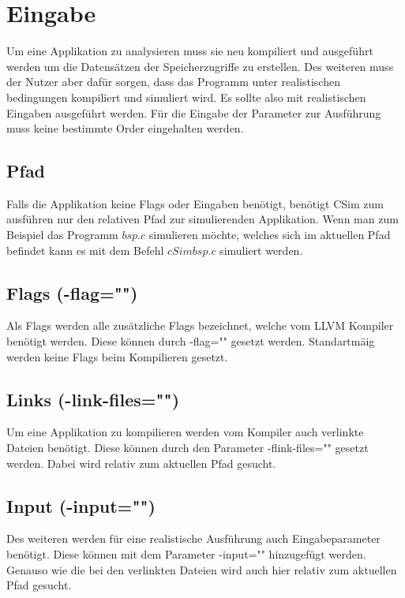 \documentclass{scrreprt}
\begin{document}
\section{Eingabe}

Um eine Applikation zu analysieren muss sie neu kompiliert und ausgeführt werden um die Datensätzen der Speicherzugriffe zu erstellen. Des weiteren muss der Nutzer aber dafür sorgen, dass das Programm unter realistischen bedingungen kompiliert und simuliert wird. Es sollte also mit realistischen Eingaben ausgeführt werden.\newline
Für die Eingabe der Parameter zur Ausführung muss keine bestimmte Order eingehalten werden.

\subsection{Pfad}

Falls die Applikation keine Flags oder Eingaben benötigt, benötigt CSim zum ausführen nur den relativen Pfad zur simulierenden Applikation. Wenn man zum Beispiel das Programm \(bsp.c\) simulieren möchte, welches sich im aktuellen Pfad befindet kann es mit dem Befehl \(cSim bsp.c\) simuliert werden.

\subsection{Flags (-flag="")}

Als Flags werden alle zusätzliche Flags bezeichnet, welche vom LLVM Kompiler benötigt werden. Diese können durch -flag="" gesetzt werden. Standartmäig werden keine Flags beim Kompilieren gesetzt.

\subsection{Links (-link-files="")}

Um eine Applikation zu kompilieren werden vom Kompiler auch verlinkte Dateien benötigt. Diese können durch den Parameter -flink-files="" gesetzt werden. Dabei wird relativ zum aktuellen Pfad gesucht.

\subsection{Input (-input="")}

Des weiteren werden für eine realistische Ausführung auch Eingabeparameter benötigt. Diese können mit dem Parameter -input="" hinzugefügt werden. Genauso wie die bei den verlinkten Dateien wird auch hier relativ zum aktuellen Pfad gesucht.
\end{document}
